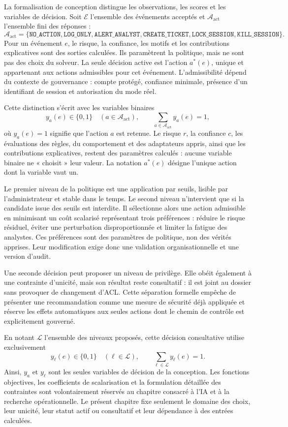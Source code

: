 \documentclass[11pt,a4paper,oneside]{report}
\theoremstyle{definition}
\theoremstyle{plain}
\begin{document}
La formalisation de conception distingue les observations, les scores et les
variables de décision. Soit \(\mathcal{E}\) l'ensemble des événements acceptés
et \(\mathcal{A}_{\mathrm{act}}\) l'ensemble fini des réponses :
\[
\mathcal{A}_{\mathrm{act}}=
\{\texttt{NO\_ACTION},\texttt{LOG\_ONLY},\texttt{ALERT\_ANALYST},
\texttt{CREATE\_TICKET},\texttt{LOCK\_SESSION},\texttt{KILL\_SESSION}\}.
\]
Pour un événement \(e\), le risque, la confiance, les motifs et les
contributions explicatives sont des sorties calculées. Ils paramètrent la
politique, mais ne sont pas des choix du solveur. La seule décision active est
l'action \(a^*(e)\), unique et appartenant aux actions admissibles pour cet
événement. L'admissibilité dépend du contexte de gouvernance : compte protégé,
confiance minimale, présence d'un identifiant de session et autorisation du
mode réel.

Cette distinction s'écrit avec les variables binaires
\[
y_a(e)\in\{0,1\}\quad(a\in\mathcal{A}_{\mathrm{act}}),
\qquad
\sum_{a\in\mathcal{A}_{\mathrm{act}}}y_a(e)=1,
\]
où \(y_a(e)=1\) signifie que l'action \(a\) est retenue. Le risque \(r\), la
confiance \(c\), les évaluations des règles, du comportement et des
adaptateurs appris, ainsi que les contributions explicatives, restent des
paramètres calculés : aucune variable binaire ne « choisit » leur valeur. La
notation \(a^*(e)\) désigne l'unique action dont la variable vaut un.

Le premier niveau de la politique est une application par seuils, lisible par
l'administrateur et stable dans le temps. Le second niveau n'intervient que si
la candidate issue des seuils est interdite. Il sélectionne alors une action
admissible en minimisant un coût scalarisé représentant trois préférences :
réduire le risque résiduel, éviter une perturbation disproportionnée et limiter
la fatigue des analystes. Ces préférences sont des paramètres de politique,
non des vérités apprises. Leur modification exige donc une validation
organisationnelle et une version d'audit.

Une seconde décision peut proposer un niveau de privilège. Elle obéit également
à une contrainte d'unicité, mais son résultat reste consultatif : il est joint
au dossier sans provoquer de changement d'ACL. Cette séparation formelle
empêche de présenter une recommandation comme une mesure de sécurité déjà
appliquée et réserve les effets automatiques aux seules actions dont le chemin
de contrôle est explicitement gouverné.

En notant \(\mathcal{L}\) l'ensemble des niveaux proposés, cette décision
consultative utilise exclusivement
\[
y_\ell(e)\in\{0,1\}\quad(\ell\in\mathcal{L}),
\qquad
\sum_{\ell\in\mathcal{L}}y_\ell(e)=1.
\]
Ainsi, \(y_a\) et \(y_\ell\) sont les seules variables de décision de la
conception. Les fonctions objectives, les coefficients de scalarisation et la
formulation détaillée des contraintes sont volontairement réservés au chapitre
consacré à l'IA et à la recherche opérationnelle. Le présent chapitre fixe
seulement le domaine des choix, leur unicité, leur statut actif ou consultatif
et leur dépendance à des entrées calculées.
\end{document}
